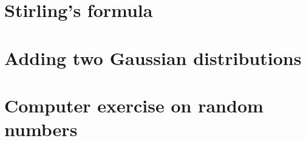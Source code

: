 \documentclass[11 pt]{article}
\begin{document}
    \section{Stirling's formula}
    

    \newpage
    \section{Adding two Gaussian distributions}
    

    \newpage
    \section{Computer exercise on random numbers}
    
\end{document}
